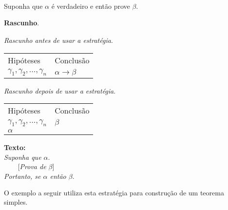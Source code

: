 \begin{ProofStrategy}\label{imp1}
Suponha que $\alpha$ é verdadeiro e então prove $\beta$.
\begin{flushleft}
 \textbf{Rascunho}.\\
\verb| |\\

\textit{Rascunho antes de usar a estratégia}.
\verb| |\\
\begin{tabular}{ll}
Hipóteses & Conclusão \\
$\gamma_1,\gamma_2,...,\gamma_n$ & $\alpha\to \beta$\\
\end{tabular}

\textit{Rascunho depois de usar a estratégia}.
\verb| |\\
\begin{tabular}{ll}
Hipóteses & Conclusão \\
$\gamma_1,\gamma_2,...,\gamma_n$ & $\beta$\\
$\alpha$                                              & \\
\end{tabular}
\end{flushleft}
\begin{flushleft}
\textbf{Texto:}\\
\textit{Suponha que $\alpha$}.\\
\verb|    |[\textit{Prova de $\beta$}]\\
\textit{Portanto, se $\alpha$ então $\beta$}.
\end{flushleft}
\end{ProofStrategy}
O exemplo a seguir utiliza esta estratégia para construção de um
teorema simples.
